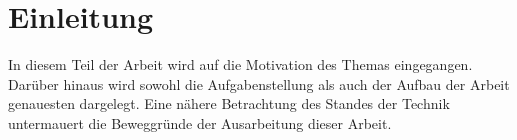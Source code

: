 
\chapter{Einleitung}
In diesem Teil der Arbeit wird auf die Motivation des Themas eingegangen. Darüber hinaus wird sowohl die Aufgabenstellung als auch der 
Aufbau der Arbeit genauesten dargelegt. Eine nähere Betrachtung des Standes der Technik untermauert die Beweggründe der Ausarbeitung 
dieser Arbeit. 

